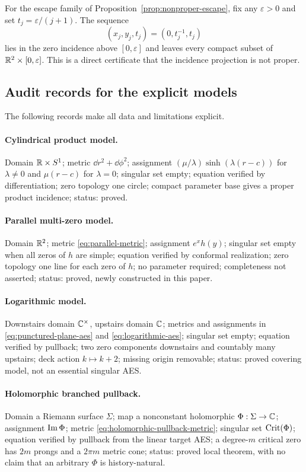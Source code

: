 For the escape family of Proposition~\ref{prop:nonproper-escape}, fix any
$\varepsilon>0$ and set $t_j=\varepsilon/(j+1)$.  The sequence
\[
 (x_j,y_j,t_j)=(0,t_j^{-1},t_j)
\]
lies in the zero incidence above $[0,\varepsilon]$ and leaves every compact subset
of $\mathbb{R}^2\times[0,\varepsilon]$.  This is a direct certificate that the incidence
projection is not proper.

\subsection{Audit records for the explicit models}

The following records make all data and limitations explicit.

\paragraph{Cylindrical product model.}
Domain $\mathbb{R}\times S^1$; metric $\dd r^2+\dd\phi^2$; assignment
$(\mu/\lambda)\sinh(\lambda(r-c))$ for $\lambda\ne0$ and $\mu(r-c)$ for
$\lambda=0$; singular set empty; equation verified by differentiation; zero
topology one circle; compact parameter base gives a proper product incidence;
status: proved.

\paragraph{Parallel multi-zero model.}
Domain $\mathbb{R}^2$; metric \eqref{eq:parallel-metric}; assignment $e^xh(y)$; singular
set empty when all zeros of $h$ are simple; equation verified by conformal
realization; zero topology one line for each zero of $h$; no parameter required;
completeness not asserted; status: proved, newly constructed in this paper.

\paragraph{Logarithmic model.}
Downstairs domain $\mathbb{C}^\times$, upstairs domain $\mathbb{C}$; metrics and assignments in
\eqref{eq:punctured-plane-aes} and \eqref{eq:logarithmic-aes}; singular set empty;
equation verified by pullback; two zero components downstairs and countably many
upstairs; deck action $k\mapsto k+2$; missing origin removable; status: proved
covering model, not an essential singular AES.

\paragraph{Holomorphic branched pullback.}
Domain a Riemann surface $\Sigma$; map a nonconstant holomorphic
$\Phi:\Sigma\to\mathbb{C}$; assignment $\operatorname{Im}\Phi$; metric
\eqref{eq:holomorphic-pullback-metric}; singular set $\operatorname{Crit}(\Phi)$; equation
verified by pullback from the linear target AES; a degree-$m$ critical zero has
$2m$ prongs and a $2\pi m$ metric cone; status: proved local theorem, with no
claim that an arbitrary $\Phi$ is history-natural.

